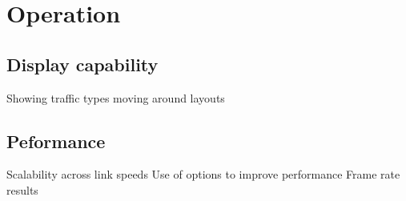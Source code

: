 \section{Operation}
\label{operation}

\subsection{Display capability}
Showing traffic types
moving around
layouts


\subsection{Peformance}

Scalability across link speeds
Use of options to improve performance
Frame rate results


